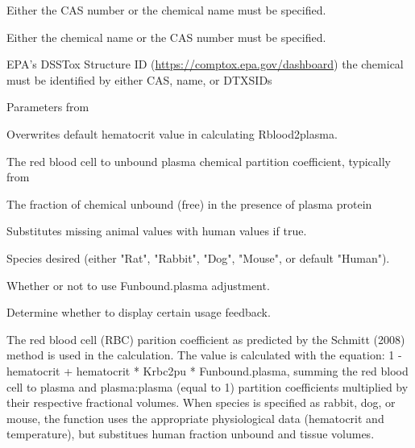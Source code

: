 \documentclass[a4paper]{book}
\begin{document}
\begin{Arguments}
\begin{ldescription}
\item[\code{chem.cas}] Either the CAS number or the chemical name must be
specified.

\item[\code{chem.name}] Either the chemical name or the CAS number must be
specified.

\item[\code{dtxsid}] EPA's DSSTox Structure ID (\url{https://comptox.epa.gov/dashboard})
the chemical must be identified by either CAS, name, or DTXSIDs

\item[\code{parameters}] Parameters from 

\item[\code{hematocrit}] Overwrites default hematocrit value in calculating
Rblood2plasma.

\item[\code{Krbc2pu}] The red blood cell to unbound plasma chemical partition
coefficient, typically from 

\item[\code{Funbound.plasma}] The fraction of chemical unbound (free) in the
presence of plasma protein

\item[\code{default.to.human}] Substitutes missing animal values with human values
if true.

\item[\code{species}] Species desired (either "Rat", "Rabbit", "Dog", "Mouse", or
default "Human").

\item[\code{adjusted.Funbound.plasma}] Whether or not to use Funbound.plasma
adjustment.

\item[\code{suppress.messages}] Determine whether to display certain usage
feedback.
\end{ldescription}
\end{Arguments}
%
\begin{Details}\relax
The red blood cell (RBC) parition coefficient as predicted by the Schmitt
(2008) method is used in the calculation. The value is calculated with the
equation: 1 - hematocrit + hematocrit * Krbc2pu * Funbound.plasma, summing
the red blood cell to plasma and plasma:plasma (equal to 1) partition
coefficients multiplied by their respective fractional volumes. When
species is specified as rabbit, dog, or mouse, the function uses the
appropriate physiological data (hematocrit and temperature), but substitues
human fraction unbound and tissue volumes.
\end{Details}
\end{document}
